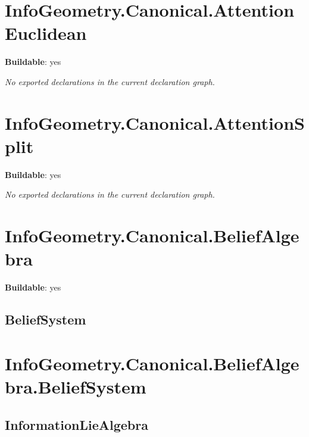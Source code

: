 \begin{theorem}[blueprint="infogeometry:canonical:attention:attentionweights:eq_1"]
\end{theorem}

\section{InfoGeometry.Canonical.AttentionEuclidean}

\noindent\textbf{Buildable}: yes

\noindent\emph{No exported declarations in the current declaration graph.}

\section{InfoGeometry.Canonical.AttentionSplit}

\noindent\textbf{Buildable}: yes

\noindent\emph{No exported declarations in the current declaration graph.}

\section{InfoGeometry.Canonical.BeliefAlgebra}

\noindent\textbf{Buildable}: yes

\subsection*{BeliefSystem}

\begin{theorem}[blueprint="infogeometry:canonical:beliefalgebra:beliefsystem"]
\end{theorem}

\section{InfoGeometry.Canonical.BeliefAlgebra.BeliefSystem}

\subsection*{InformationLieAlgebra}

\begin{theorem}[blueprint="infogeometry:canonical:beliefalgebra:beliefsystem:informationliealgebra"]
\end{theorem}


